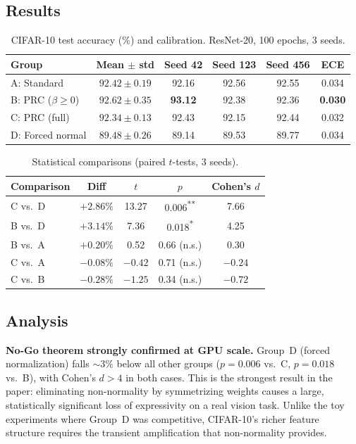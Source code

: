\documentclass[11pt,a4paper]{article}
\theoremstyle{definition}
\begin{document}
\subsection{Results}

\begin{table}[ht]
\centering
\caption{CIFAR-10 test accuracy (\%) and calibration. ResNet-20, 100 epochs, 3 seeds.}
\label{tab:cifar}
\begin{tabular}{@{}lccccc@{}}
\toprule
Group & Mean $\pm$ std & Seed 42 & Seed 123 & Seed 456 & ECE \\
\midrule
A: Standard       & $92.42 \pm 0.19$ & 92.16 & 92.56 & 92.55 & 0.034 \\
B: PRC ($\beta \geq 0$)  & $92.62 \pm 0.35$ & \textbf{93.12} & 92.38 & 92.36 & \textbf{0.030} \\
C: PRC (full)     & $92.34 \pm 0.13$ & 92.43 & 92.15 & 92.44 & 0.032 \\
D: Forced normal  & $89.48 \pm 0.26$ & 89.14 & 89.53 & 89.77 & 0.034 \\
\bottomrule
\end{tabular}
\end{table}

\begin{table}[ht]
\centering
\caption{Statistical comparisons (paired $t$-tests, 3 seeds).}
\label{tab:cifar-stats}
\begin{tabular}{@{}lcccc@{}}
\toprule
Comparison & Diff & $t$ & $p$ & Cohen's $d$ \\
\midrule
C vs.\ D & $+2.86\%$ & 13.27 & 0.006\textsuperscript{**} & 7.66 \\
B vs.\ D & $+3.14\%$ & 7.36  & 0.018\textsuperscript{*}  & 4.25 \\
B vs.\ A & $+0.20\%$ & 0.52  & 0.66 (n.s.) & 0.30 \\
C vs.\ A & $-0.08\%$ & $-0.42$ & 0.71 (n.s.) & $-0.24$ \\
C vs.\ B & $-0.28\%$ & $-1.25$ & 0.34 (n.s.) & $-0.72$ \\
\bottomrule
\end{tabular}
\end{table}

\subsection{Analysis}

\textbf{No-Go theorem strongly confirmed at GPU scale.}
Group~D (forced normalization) falls $\sim 3\%$ below all other groups
($p = 0.006$ vs.\ C, $p = 0.018$ vs.\ B), with Cohen's $d > 4$ in
both cases. This is the strongest result in the paper: eliminating
non-normality by symmetrizing weights causes a large, statistically
significant loss of expressivity on a real vision task. Unlike the
toy experiments where Group~D was competitive, CIFAR-10's richer
feature structure requires the transient amplification that
non-normality provides.
\end{document}

